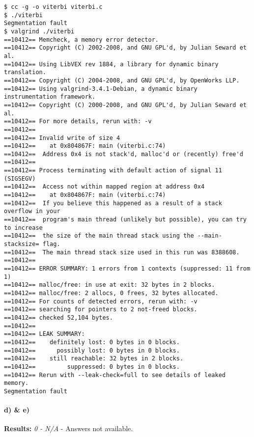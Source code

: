 \documentclass[a4paper,11pt]{article}
\begin{document}
\begin{verbatim}
$ cc -g -o viterbi viterbi.c 
$ ./viterbi 
Segmentation fault
$ valgrind ./viterbi 
==10412== Memcheck, a memory error detector.
==10412== Copyright (C) 2002-2008, and GNU GPL'd, by Julian Seward et al.
==10412== Using LibVEX rev 1884, a library for dynamic binary translation.
==10412== Copyright (C) 2004-2008, and GNU GPL'd, by OpenWorks LLP.
==10412== Using valgrind-3.4.1-Debian, a dynamic binary instrumentation framework.
==10412== Copyright (C) 2000-2008, and GNU GPL'd, by Julian Seward et al.
==10412== For more details, rerun with: -v
==10412== 
==10412== Invalid write of size 4
==10412==    at 0x804867F: main (viterbi.c:74)
==10412==  Address 0x4 is not stack'd, malloc'd or (recently) free'd
==10412== 
==10412== Process terminating with default action of signal 11 (SIGSEGV)
==10412==  Access not within mapped region at address 0x4
==10412==    at 0x804867F: main (viterbi.c:74)
==10412==  If you believe this happened as a result of a stack overflow in your
==10412==  program's main thread (unlikely but possible), you can try to increase
==10412==  the size of the main thread stack using the --main-stacksize= flag.
==10412==  The main thread stack size used in this run was 8388608.
==10412== 
==10412== ERROR SUMMARY: 1 errors from 1 contexts (suppressed: 11 from 1)
==10412== malloc/free: in use at exit: 32 bytes in 2 blocks.
==10412== malloc/free: 2 allocs, 0 frees, 32 bytes allocated.
==10412== For counts of detected errors, rerun with: -v
==10412== searching for pointers to 2 not-freed blocks.
==10412== checked 52,104 bytes.
==10412== 
==10412== LEAK SUMMARY:
==10412==    definitely lost: 0 bytes in 0 blocks.
==10412==      possibly lost: 0 bytes in 0 blocks.
==10412==    still reachable: 32 bytes in 2 blocks.
==10412==         suppressed: 0 bytes in 0 blocks.
==10412== Rerun with --leak-check=full to see details of leaked memory.
Segmentation fault

\end{verbatim}

\paragraph{d) \& e)}

\textbf{Results:} \emph{0 - N/A} - Answers not available.
\end{document}
